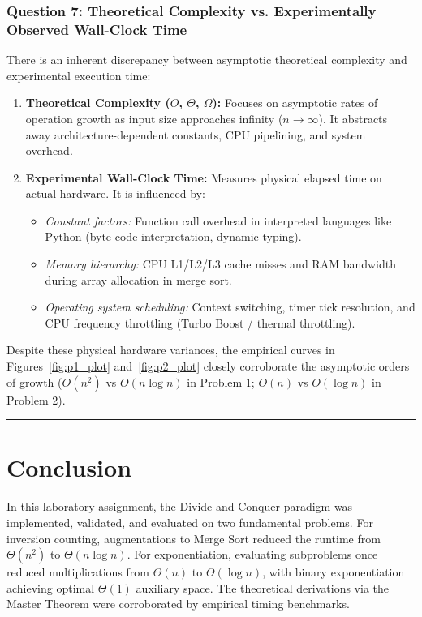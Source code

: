 \documentclass[12pt]{article}
\begin{document}
\subsubsection{Question 7: Theoretical Complexity vs. Experimentally Observed Wall-Clock Time}
There is an inherent discrepancy between asymptotic theoretical complexity and experimental execution time:
\begin{enumerate}
    \item \textbf{Theoretical Complexity ($O$, $\Theta$, $\Omega$):} Focuses on asymptotic rates of operation growth as input size approaches infinity ($n \to \infty$). It abstracts away architecture-dependent constants, CPU pipelining, and system overhead.
    \item \textbf{Experimental Wall-Clock Time:} Measures physical elapsed time on actual hardware. It is influenced by:
    \begin{itemize}
        \item \textit{Constant factors:} Function call overhead in interpreted languages like Python (byte-code interpretation, dynamic typing).
        \item \textit{Memory hierarchy:} CPU L1/L2/L3 cache misses and RAM bandwidth during array allocation in merge sort.
        \item \textit{Operating system scheduling:} Context switching, timer tick resolution, and CPU frequency throttling (Turbo Boost / thermal throttling).
    \end{itemize}
\end{enumerate}
Despite these physical hardware variances, the empirical curves in Figures~\ref{fig:p1_plot} and~\ref{fig:p2_plot} closely corroborate the asymptotic orders of growth ($O(n^2)$ vs $O(n \log n)$ in Problem 1; $O(n)$ vs $O(\log n)$ in Problem 2).

\hrule
\vspace{0.3cm}

\section{Conclusion}
In this laboratory assignment, the Divide and Conquer paradigm was implemented, validated, and evaluated on two fundamental problems. For inversion counting, augmentations to Merge Sort reduced the runtime from $\Theta(n^2)$ to $\Theta(n \log n)$. For exponentiation, evaluating subproblems once reduced multiplications from $\Theta(n)$ to $\Theta(\log n)$, with binary exponentiation achieving optimal $\Theta(1)$ auxiliary space. The theoretical derivations via the Master Theorem were corroborated by empirical timing benchmarks.
\end{document}
